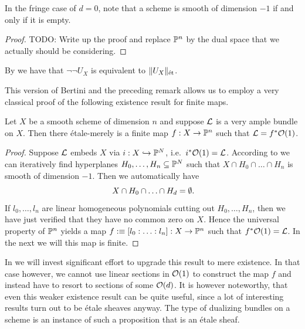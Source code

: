 In the fringe case of $d=0$, note that a scheme is smooth of dimension $-1$ if and only if it is empty.

\begin{proof}
  {\color{red}TODO: Write up the proof and replace $\bP^n$ by the dual space that we actually should be considering.}
\end{proof}

\begin{remark}
  By  we have that $\neg\neg U_X$ is equivalent to $\|U_X\|_\et$.
\end{remark}

This version of Bertini and the preceding remark allows us to employ a very classical proof of the following existence result for finite maps.

\begin{corollary}
  \label{etale-merely-finite-map}
  Let $X$ be a smooth scheme of dimension $n$ and suppose $\mc L$ is a very ample bundle on $X$.
  Then there étale-merely is a finite map $f : X \to \bP^n$ such that $\mc L = f^\ast\mc O(1)$.
\end{corollary}

\begin{proof}
  Suppose $\mc L$ embeds $X$ via $i : X \hookrightarrow \bP^N$, i.e.\ $i^\ast\mc O(1) = \mc L$.
  According to  we can iteratively find hyperplanes $H_0, \hdots, H_n \subseteq \bP^N$ such that $X \cap H_0 \cap \hdots \cap H_n$ is smooth of dimension $-1$.
  Then we automatically have
  \[
    X \cap H_0 \cap \hdots \cap H_d = \emptyset \rlap{.}
  \]
  If $l_0, \hdots, l_n$ are linear homogeneous polynomials cutting out $H_0, \hdots, H_n$, then we have just verified that they have no common zero on $X$.
  Hence the universal property of $\bP^n$ yields a map $f :\equiv [l_0 : \hdots : l_n] : X \to \bP^n$ such that $f^\ast\mc O(1) = \mc L$.
  In the next  we will this map is finite.
\end{proof}

In  we will invest significant effort to upgrade this result to mere existence.
In that case however, we cannot use linear sections in $\mc O(1)$ to construct the map $f$ and instead have to resort to sections of some $\mc O(d)$.
It is however noteworthy, that even this weaker existence result can be quite useful, since a lot of interesting results turn out to be étale sheaves anyway.
The type of dualizing bundles on a scheme is an instance of such a proposition that is an étale sheaf.

